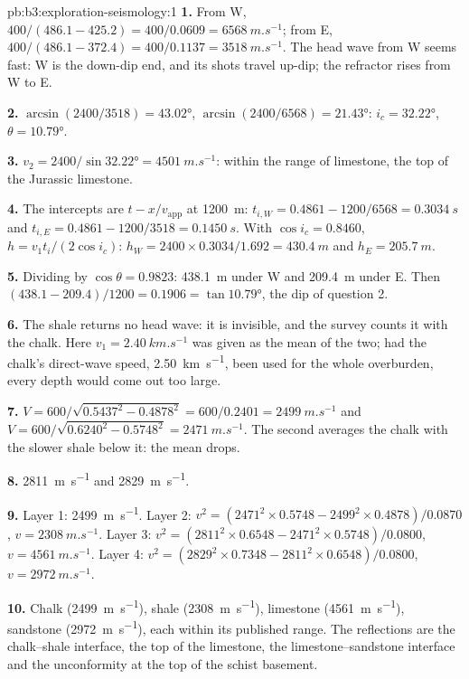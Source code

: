 \begin{solution}{pb:b3:exploration-seismology:1}
\textbf{1.} From W, $400/(486.1 - 425.2) = 400/0.0609 = \qty{6568}{m.s^{-1}}$;
from E, $400/(486.1 - 372.4) = 400/0.1137 = \qty{3518}{m.s^{-1}}$. The head
wave from W seems fast: W is the down-dip end, and its shots travel up-dip; the
refractor rises from W to E.

\textbf{2.} $\arcsin(2400/3518) = \ang{43.02}$, $\arcsin(2400/6568) =
\ang{21.43}$: $i_c = \ang{32.22}$, $\theta = \ang{10.79}$.

\textbf{3.} $v_2 = 2400/\sin\ang{32.22} = \qty{4501}{m.s^{-1}}$: within the
range of limestone, the top of the Jurassic limestone.

\textbf{4.} The intercepts are $t - x/v_{\text{app}}$ at \qty{1200}{m}:
$t_{i,W} = 0.4861 - 1200/6568 = \qty{0.3034}{s}$ and $t_{i,E} = 0.4861 -
1200/3518 = \qty{0.1450}{s}$. With $\cos i_c = 0.8460$, $h = v_1t_i/(2\cos
i_c)$: $h_W = 2400\times0.3034/1.692 = \qty{430.4}{m}$ and $h_E =
\qty{205.7}{m}$.

\textbf{5.} Dividing by $\cos\theta = 0.9823$: \qty{438.1}{m} under W and
\qty{209.4}{m} under E. Then $(438.1 - 209.4)/1200 = 0.1906 =
\tan\ang{10.79}$, the dip of question 2.

\textbf{6.} The shale returns no head wave: it is invisible, and the survey
counts it with the chalk. Here $v_1 = \qty{2.40}{km.s^{-1}}$ was given as the
mean of the two; had the chalk's direct-wave speed, \qty{2.50}{km.s^{-1}},
been used for the whole overburden, every depth would come out too large.

\textbf{7.} $V = 600/\sqrt{0.5437^2 - 0.4878^2} = 600/0.2401 =
\qty{2499}{m.s^{-1}}$ and $V = 600/\sqrt{0.6240^2 - 0.5748^2} =
\qty{2471}{m.s^{-1}}$. The second averages the chalk with the slower shale
below it: the mean drops.

\textbf{8.} \qty{2811}{m.s^{-1}} and \qty{2829}{m.s^{-1}}.

\textbf{9.} Layer 1: \qty{2499}{m.s^{-1}}. Layer 2: $v^2 = (2471^2\times0.5748
- 2499^2\times0.4878)/0.0870$, $v = \qty{2308}{m.s^{-1}}$. Layer 3:
$v^2 = (2811^2\times0.6548 - 2471^2\times0.5748)/0.0800$,
$v = \qty{4561}{m.s^{-1}}$. Layer 4: $v^2 = (2829^2\times0.7348 -
2811^2\times0.6548)/0.0800$, $v = \qty{2972}{m.s^{-1}}$.

\textbf{10.} Chalk (\qty{2499}{m.s^{-1}}), shale (\qty{2308}{m.s^{-1}}),
limestone (\qty{4561}{m.s^{-1}}), sandstone (\qty{2972}{m.s^{-1}}), each within
its published range. The reflections are the chalk--shale interface, the top
of the limestone, the limestone--sandstone interface and the unconformity at
the top of the schist basement.


\end{solution}

